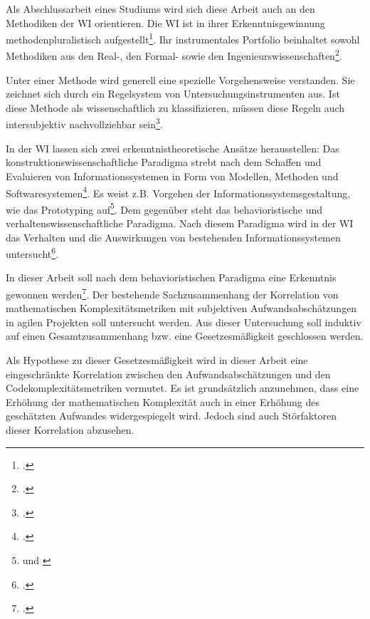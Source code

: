 Als Abschlussarbeit eines Studiums wird sich
diese Arbeit auch an den Methodiken der \ac{WI} orientieren. Die \ac{WI} ist in
ihrer Erkenntnisgewinnung methodenpluralistisch aufgestellt\footcite[Vgl. ][S. 1]{wildeMethodenspektrumWirtschaftsinformatikUberblick2006}. Ihr instrumentales Portfolio beinhaltet
sowohl Methodiken aus den Real-, den Formal- sowie den
Ingenieurswissenschaften\footcite[Vgl. ][S. 1]{wildeMethodenspektrumWirtschaftsinformatikUberblick2006}.

Unter einer Methode wird generell eine spezielle Vorgehensweise
verstanden. Sie zeichnet sich durch ein Regelsystem von
Untersuchungsinstrumenten aus. Ist diese Methode als wissenschaftlich zu
klassifizieren, müssen diese Regeln auch intersubjektiv nachvollziehbar
sein\footcite[Vgl. ][S. 1f]{wildeMethodenspektrumWirtschaftsinformatikUberblick2006}.

In der \ac{WI} lassen sich zwei erkenntnistheoretische Ansätze herausstellen:
Das konstruktionswissenschaftliche Paradigma strebt nach dem Schaffen
und Evaluieren von Informationssystemen in Form von Modellen, Methoden
und Softwaresystemen\footcite[Vgl. ][S. 2]{wildeMethodenspektrumWirtschaftsinformatikUberblick2006}. Es weist z.B.
Vorgehen der Informationssystemsgestaltung, wie das Prototyping
auf\footnote{\cite[Vgl. ][S. 3]{wildeMethodenspektrumWirtschaftsinformatikUberblick2006} und \cite{simonSciencesArtificial2019}}. Dem gegenüber steht das
behavioristische und verhaltenswissenschaftliche Paradigma. Nach diesem
Paradigma wird in der \ac{WI} das Verhalten und die Auswirkungen von
bestehenden Informationssystemen untersucht\footcite[Vgl. ][S. 3]{wildeMethodenspektrumWirtschaftsinformatikUberblick2006}.

In dieser Arbeit soll nach dem behavioristischen Paradigma eine
Erkenntnis gewonnen werden\footcite[Vgl. ][S. 3]{wildeMethodenspektrumWirtschaftsinformatikUberblick2006}. Der
bestehende Sachzusammenhang der Korrelation von mathematischen
Komplexitätsmetriken mit subjektiven Aufwandsabschätzungen in agilen
Projekten soll untersucht werden. Aus dieser Untersuchung soll induktiv
auf einen Gesamtzusammenhang bzw. eine Gesetzesmä\ss igkeit geschlossen
werden.

Als Hypothese zu dieser Gesetzesmä\ss igkeit wird in dieser Arbeit eine
eingeschränkte Korrelation zwischen den Aufwandsabschätzungen und den
Codekomplexitätsmetriken vermutet. Es ist grundsätzlich anzunehmen, dass
eine Erhöhung der mathematischen Komplexität auch in einer Erhöhung des
geschätzten Aufwandes widergespiegelt wird. Jedoch sind auch
Störfaktoren dieser Korrelation abzusehen.

